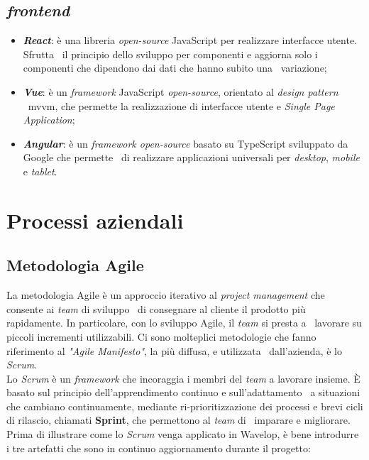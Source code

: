 \subsection{\emph{\Gls{frontend}}}

\begin{itemize}
  \item \textbf{\emph{React}}: è una libreria \emph{\gls{open-source}} JavaScript per realizzare interfacce utente. Sfrutta \
  il principio dello sviluppo per componenti e aggiorna solo i componenti che dipendono dai dati che hanno subito una \
  variazione;
  \item \textbf{\emph{Vue}}: è un \emph{framework} JavaScript \emph{open-source}, orientato al \emph{design pattern} \
  \acrshort{mvvm}, che permette la realizzazione di interfacce utente e \emph{Single Page Application};
  \item \textbf{\emph{Angular}}: è un \emph{framework open-source} basato su TypeScript sviluppato da Google che permette \
  di realizzare applicazioni universali per \emph{desktop}, \emph{mobile} e \emph{tablet}.
\end{itemize}

\section{Processi aziendali}

\subsection{Metodologia Agile}
La metodologia Agile è un approccio iterativo al \emph{project management} che consente ai \emph{team} di sviluppo \
di consegnare al cliente il prodotto più rapidamente. In particolare, con lo sviluppo Agile, il \emph{team} si presta a \
lavorare su piccoli incrementi utilizzabili. Ci sono molteplici metodologie che fanno riferimento al \emph{"Agile Manifesto"}, la più diffusa, e utilizzata \
dall'azienda, è lo \emph{Scrum}. \\

Lo \emph{Scrum} è un \emph{framework} che incoraggia i membri del \emph{team} a lavorare insieme. È basato sul principio dell'apprendimento continuo e sull'adattamento \
a situazioni che cambiano continuamente, mediante ri-prioritizzazione dei processi e brevi cicli di rilascio, chiamati \textbf{Sprint}, che permettono al \emph{team} di \
imparare e migliorare. Prima di illustrare come lo \emph{Scrum} venga applicato in Wavelop, è bene introdurre i tre artefatti che sono in continuo aggiornamento durante il progetto:

